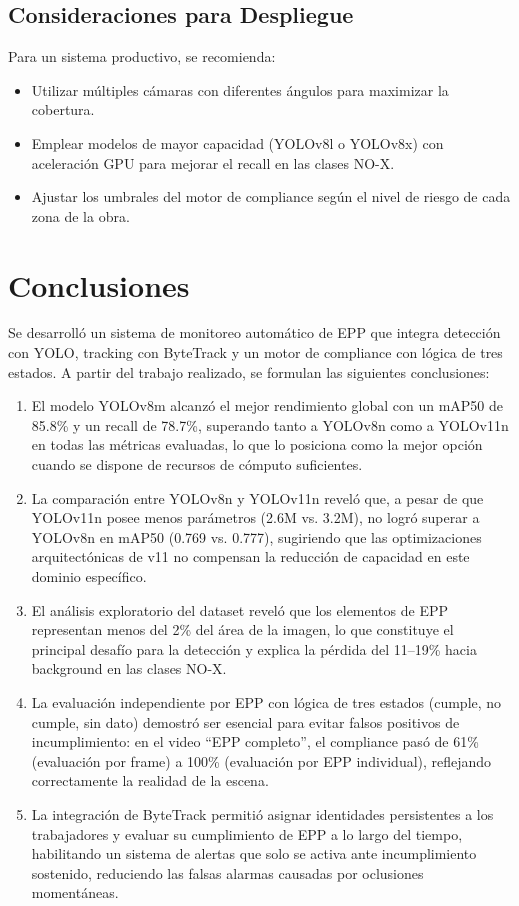 \documentclass[conference, 10pt]{IEEEtran}
\begin{document}
\subsection{Consideraciones para Despliegue}

Para un sistema productivo, se recomienda:
\begin{itemize}
    \item Utilizar múltiples cámaras con diferentes ángulos para maximizar la cobertura.
    \item Emplear modelos de mayor capacidad (YOLOv8l o YOLOv8x) con aceleración GPU para mejorar el recall en las clases NO-X.
    \item Ajustar los umbrales del motor de compliance según el nivel de riesgo de cada zona de la obra.
\end{itemize}

\section{Conclusiones}

Se desarrolló un sistema de monitoreo automático de EPP que integra detección con YOLO, tracking con ByteTrack y un motor de compliance con lógica de tres estados. A partir del trabajo realizado, se formulan las siguientes conclusiones:

\begin{enumerate}
    \item El modelo YOLOv8m alcanzó el mejor rendimiento global con un mAP50 de 85.8\% y un recall de 78.7\%, superando tanto a YOLOv8n como a YOLOv11n en todas las métricas evaluadas, lo que lo posiciona como la mejor opción cuando se dispone de recursos de cómputo suficientes.
    \item La comparación entre YOLOv8n y YOLOv11n reveló que, a pesar de que YOLOv11n posee menos parámetros (2.6M vs. 3.2M), no logró superar a YOLOv8n en mAP50 (0.769 vs. 0.777), sugiriendo que las optimizaciones arquitectónicas de v11 no compensan la reducción de capacidad en este dominio específico.
    \item El análisis exploratorio del dataset reveló que los elementos de EPP representan menos del 2\% del área de la imagen, lo que constituye el principal desafío para la detección y explica la pérdida del 11--19\% hacia background en las clases NO-X.
    \item La evaluación independiente por EPP con lógica de tres estados (cumple, no cumple, sin dato) demostró ser esencial para evitar falsos positivos de incumplimiento: en el video ``EPP completo'', el compliance pasó de 61\% (evaluación por frame) a 100\% (evaluación por EPP individual), reflejando correctamente la realidad de la escena.
    \item La integración de ByteTrack permitió asignar identidades persistentes a los trabajadores y evaluar su cumplimiento de EPP a lo largo del tiempo, habilitando un sistema de alertas que solo se activa ante incumplimiento sostenido, reduciendo las falsas alarmas causadas por oclusiones momentáneas.
\end{enumerate}
\end{document}

